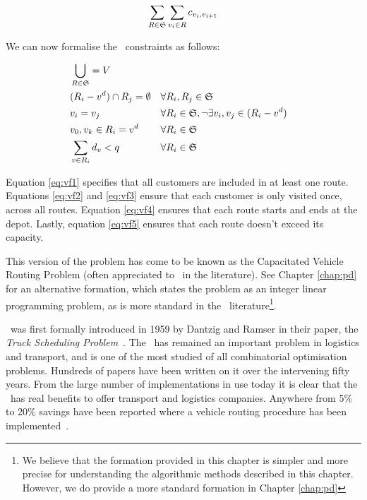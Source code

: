 \[
   \sum_{R \in \mathfrak{S}} \sum_{v_i \in R} c_{v_i, v_{i+1}}
\]

We can now formalise the \VRP\ constraints as follows:

\begin{align}
   & \bigcup_{R \in \mathfrak{S}} = V \label{eq:vf1}\\
   & (R_i - v^d) \cap R_j = \emptyset  && \forall R_i, R_j \in \mathfrak{S} \label{eq:vf2}\\
   & v_i = v_j                               && \forall R_i \in \mathfrak{S}, \lnot \exists v_i, v_j \in (R_i - v^d) \label{eq:vf3}\\
   & v_0, v_k \in R_i = v^d                  && \forall R_i \in \mathfrak{S} \label{eq:vf4}\\
   & \sum_{v \in R_i} d_v < q                && \forall R_i \in \mathfrak{S} \label{eq:vf5}
\end{align}

Equation \eqref{eq:vf1} specifies that all customers are included in at least one route. Equations \eqref{eq:vf2} and \eqref{eq:vf3} ensure that each customer is only visited once, across all routes. Equation \eqref{eq:vf4} ensures that each route starts and ends at the depot. Lastly, equation \eqref{eq:vf5} ensures that each route doesn't exceed its capacity. 

This version of the problem has come to be known as the Capacitated Vehicle Routing Problem (often appreciated to \CVRP\ in the literature). See Chapter \ref{chap:pd} for an alternative formation, which states the problem as an integer linear programming problem, as is more standard in the \VRP\ literature\footnote{We believe that the formation provided in this chapter is simpler and more precise for understanding the algorithmic methods described in this chapter. However, we do provide a more standard formation in Chapter \ref{chap:pd}}.

\VRP\ was first formally introduced in 1959 by Dantzig and Ramser in their paper, the \emph{Truck Scheduling Problem}~\cite{Dantzig:1959}. The \VRP\ has remained an important problem in logistics and transport, and is one of the most studied of all combinatorial optimisation problems. Hundreds of papers have been written on it over the intervening fifty years. From the large number of implementations in use today it is clear that the \VRP\ has real benefits to offer transport and logistics companies. Anywhere from 5\% to 20\% savings have been reported where a vehicle routing procedure has been implemented~\cite{TV2001}.


